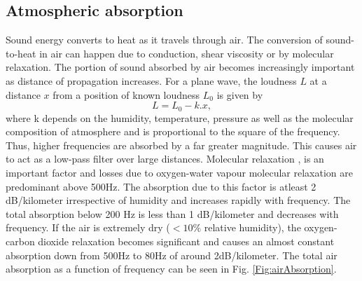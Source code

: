 \subsection{Atmospheric absorption}
Sound energy converts to heat as it travels through air. The conversion of sound-to-heat in air can happen due to conduction, shear viscosity or by molecular relaxation. The portion of sound absorbed by air becomes increasingly important as distance of propagation increases. For a plane wave, the loudness $L$ at a distance $x$ from a position of known loudness $L_0$ is given by
\begin{equation}
    L= L_0 - k.x,
\end{equation}
where k depends on the humidity, temperature, pressure as well as the molecular composition of atmosphere and is proportional to the square of the frequency. Thus, higher frequencies are absorbed by a far greater magnitude. This causes air to act as a low-pass filter over large distances. Molecular relaxation \cite{bass1990atmospheric}, \cite{evans1972atmospheric} is an important factor and losses due to oxygen-water vapour molecular relaxation are predominant above 500Hz. The absorption due to this factor is atleast 2 dB/kilometer irrespective of humidity and increases rapidly with frequency. The total absorption below 200 Hz is less than 1 dB/kilometer and decreases with frequency. If the air is extremely dry ($< 10\%$ relative humidity), the oxygen-carbon dioxide relaxation becomes significant and causes an almost constant absorption down from 500Hz to 80Hz of around 2dB/kilometer. The total air absorption as a function of frequency can be seen in Fig. \ref{Fig:airAbsorption}.

